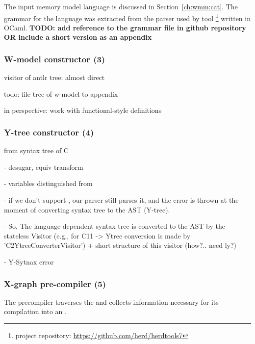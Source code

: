 The input memory model language \cat{} is discussed in Section~\ref{ch:wmm:cat}.
The  grammar for the \cat{} language was extracted from the parser used by  tool%
\footnote{ project repository: \url{https://github.com/herd/herdtools7}} %
written in OCaml.
\textbf{TODO: add reference to the grammar file in github repository OR include a short version as an appendix}



\subsubsection{W-model constructor (3)}
\label{ch:impl:proc:w-constr}


visitor of antlr tree: almost direct

todo: file tree of w-model to appendix

in perspective: work with functional-style definitions


\subsubsection{Y-tree constructor (4)}
\label{ch:impl:proc:y-constr}

from  syntax tree of C

- desugar, equiv transform

- variables distinguished from 

- if we don't support , our parser still parses it, and the error is thrown at the moment of converting syntax tree to the AST (Y-tree).

- So, The language-dependent syntax tree is converted to the AST by the stateless Visitor (e.g., for C11 -> Ytree conversion is made by 'C2YtreeConverterVisitor') + short structure of this visitor (how?.. need ly?)

- Y-Sytnax error

\subsubsection{X-graph pre-compiler (5)}
\label{ch:impl:proc:x-pre-compiler}

The precompiler traverses the \ytree{} and collects information necessary for its compilation into an \xgraph{}.

